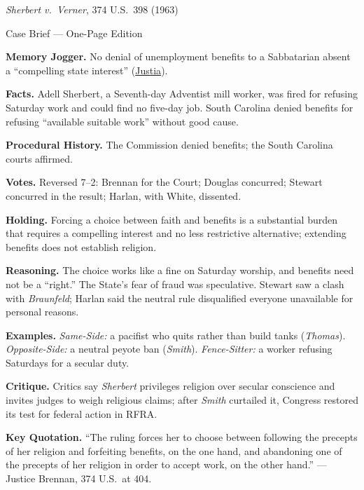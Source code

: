 \documentclass[12pt]{article}
\begin{document}
\begin{center}
{\Large \textit{Sherbert v.\ Verner}, 374 U.S.\ 398 (1963)\par}
\vspace{0.3em}
{\normalsize Case Brief --- One-Page Edition\par}
\end{center}

\textbf{Memory Jogger.} No denial of unemployment benefits to a Sabbatarian absent a ``compelling state interest'' (\href{https://supreme.justia.com/cases/federal/us/374/398/}{Justia}).

\textbf{Facts.} Adell Sherbert, a Seventh-day Adventist mill worker, was fired for refusing Saturday work and could find no five-day job. South Carolina denied benefits for refusing ``available suitable work'' without good cause.

\textbf{Procedural History.} The Commission denied benefits; the South Carolina courts affirmed.

\textbf{Votes.} Reversed 7--2: Brennan for the Court; Douglas concurred; Stewart concurred in the result; Harlan, with White, dissented.

\textbf{Holding.} Forcing a choice between faith and benefits is a substantial burden that requires a compelling interest and no less restrictive alternative; extending benefits does not establish religion.

\textbf{Reasoning.} The choice works like a fine on Saturday worship, and benefits need not be a ``right.'' The State's fear of fraud was speculative. Stewart saw a clash with \textit{Braunfeld}; Harlan said the neutral rule disqualified everyone unavailable for personal reasons.

\textbf{Examples.} \emph{Same-Side:} a pacifist who quits rather than build tanks (\textit{Thomas}). \emph{Opposite-Side:} a neutral peyote ban (\textit{Smith}). \emph{Fence-Sitter:} a worker refusing Saturdays for a secular duty.

\textbf{Critique.} Critics say \textit{Sherbert} privileges religion over secular conscience and invites judges to weigh religious claims; after \textit{Smith} curtailed it, Congress restored its test for federal action in RFRA.

\textbf{Key Quotation.} ``The ruling forces her to choose between following the precepts of her religion and forfeiting benefits, on the one hand, and abandoning one of the precepts of her religion in order to accept work, on the other hand.'' --- Justice Brennan, 374 U.S.\ at 404.
\end{document}
